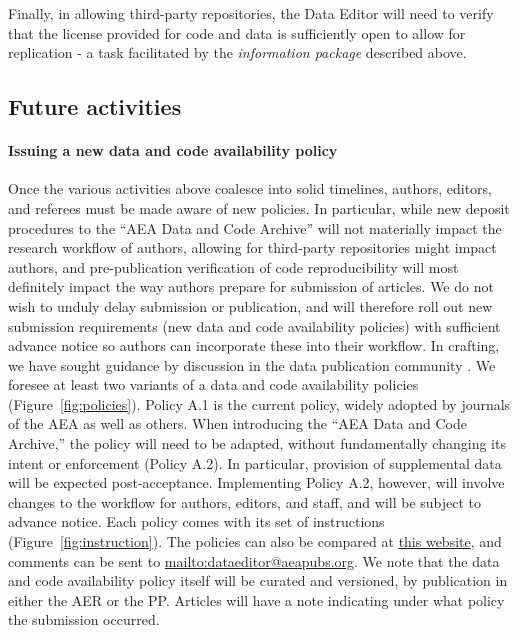 \documentclass[PP]{AEA}
\begin{document}
Finally, in allowing third-party repositories, the Data Editor will need to verify that the license provided for code and data is sufficiently open to allow for replication - a task facilitated by the \textit{information package} described above. 


\subsection{Future activities}

\paragraph{Issuing a new data and code availability policy} Once the various activities above coalesce into solid timelines, authors, editors, and referees must be made aware of new policies. In particular, while new deposit procedures to the ``AEA Data and Code Archive'' will not materially impact the research workflow of authors, allowing for third-party repositories might impact authors, and pre-publication verification of code reproducibility will most definitely impact the way authors prepare for submission of articles. We do not wish to unduly delay submission or publication, and will therefore roll out new submission requirements (new data and code availability policies) with sufficient advance notice so authors can incorporate these into their workflow. In crafting, we have sought guidance by discussion in the data publication community \citep[][e.g.]{HrynaszkiewiczStandardisingHarmonisingResearch2017}. We foresee at least two variants of a data and code availability policies (Figure~\ref{fig:policies}). Policy A.1 is the current policy, widely adopted by journals of the AEA as well as others. When introducing the ``AEA Data and Code Archive,'' the policy will need to be adapted, without fundamentally changing its intent or enforcement (Policy A.2). In particular, provision of supplemental data will be expected post-acceptance. Implementing Policy A.2, however, will involve changes to the workflow for authors, editors, and staff, and will be subject to advance notice. Each policy comes with its set of instructions  (Figure~\ref{fig:instruction}). The policies can also be compared at \href{https://docs.google.com/spreadsheets/d/1khrXxnmKC7Llj9vH17r1KEkN0hcTVqZnQloretcOwDA/edit?usp=sharing}{this website}, and comments can be sent to \url{mailto:dataeditor@aeapubs.org}. We note that the data and code availability policy itself will be curated and versioned, by publication in either the AER or the PP. Articles will have a note indicating under what policy the submission occurred. 
\end{document}
